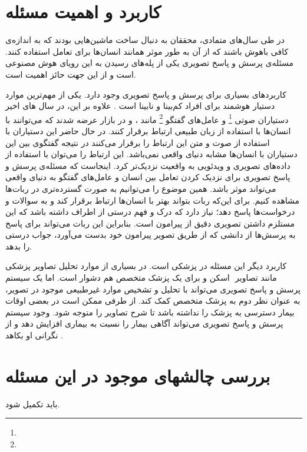 \section{کاربرد و اهمیت مسئله}
	در طی سال‌های متمادی، محققان به دنبال ساخت ماشین‌هایی بودند که به اندازه‌ی کافی باهوش باشند که از آن به طور موثر همانند انسان‌ها برای تعامل استفاده کنند. مسئله‌ی پرسش و پاسخ تصویری یکی از پله‌های رسیدن به این رویای هوش مصنوعی است و از این جهت حائز اهمیت است.

کاربردهای بسیاری برای پرسش و پاسخ تصویری وجود دارد. یکی از مهم‌ترین موارد دستیار هوشمند برای افراد کم‌بینا و نابینا  است
	\cite{gurari2018vizwiz}.
 علاوه بر این، در سال های اخیر دستیاران صوتی
 	\footnote{}
   و عامل‌های گفتگو
    \footnote{}
     مانند  
،
و
  در بازار عرضه شدند که می‌توانند با انسان‌ها با استفاده از زبان طبیعی ارتباط برقرار کنند. در حال حاضر این دستیاران با استفاده از صوت و متن این ارتباط را برقرار می‌کنند در نتیجه گفتگوی بین این دستیاران با انسان‌ها مشابه دنیای واقعی نمی‌باشد. این ارتباط را می‌توان با استفاده از داده‌های تصویری و ویدئویی به واقعیت نزدیک‌تر کرد. اینجاست که مسئله‌ی پرسش و پاسخ تصویری برای نزدیک کردن تعامل بین انسان و عامل‌های گفتگو به دنیای واقعی می‌تواند موثر باشد.  همین موضوع را می‌توانیم به صورت گسترده‌تری در ربات‌ها مشاهده کنیم. برای این‌که ربات بتواند بهتر با انسان‌ها ارتباط برقرار کند و به سوالات و درخواست‌ها پاسخ دهد؛ نیاز دارد که درک و فهم درستی از اطراف داشته باشد که این مستلزم داشتن تصویری دقیق از پیرامون است. بنابراین این ربات می‌تواند برای پاسخ به پرسش‌ها از دانشی که از طریق تصویر پیرامون خود بدست می‌آورد، جواب درستی را بدهد. 
  
  کاربرد دیگر این مسئله در پزشکی است. در بسیاری از موارد تحلیل تصاویر پزشکی مانند تصاویر
   ‌ اسکن و 
   برای یک پزشک متخصص هم دشوار است. اما یک سیستم پرسش و پاسخ تصویری می‌تواند با تحلیل و تشخیص موارد غیرطبیعی موجود در تصویر، به عنوان نظر دوم به پزشک متخصص کمک کند. از طرفی ممکن است در بعضی اوقات بیمار دسترسی به پزشک را نداشته باشد تا شرح تصاویر را متوجه شود. وجود سیستم پرسش و پاسخ تصویری می‌تواند آگاهی بیمار را نسبت به بیماری افزایش دهد و از نگرانی او بکاهد
   \cite{talafha2018just}.

\section{بررسی چالشهای موجود در این مسئله}
باید تکمیل شود.
